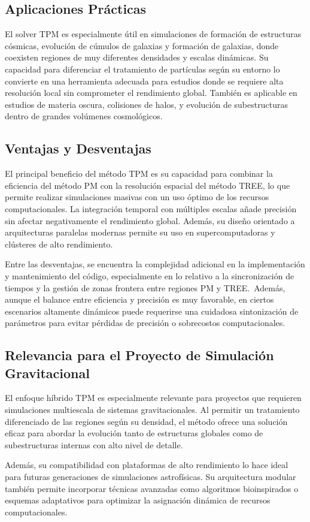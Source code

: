 \subsection{Aplicaciones Prácticas}

El solver TPM es especialmente útil en simulaciones de formación de estructuras cósmicas, evolución de cúmulos de galaxias y formación de galaxias, donde coexisten regiones de muy diferentes densidades y escalas dinámicas. Su capacidad para diferenciar el tratamiento de partículas según su entorno lo convierte en una herramienta adecuada para estudios donde se requiere alta resolución local sin comprometer el rendimiento global. También es aplicable en estudios de materia oscura, colisiones de halos, y evolución de subestructuras dentro de grandes volúmenes cosmológicos.

\subsection{Ventajas y Desventajas}

El principal beneficio del método TPM es su capacidad para combinar la eficiencia del método PM con la resolución espacial del método TREE, lo que permite realizar simulaciones masivas con un uso óptimo de los recursos computacionales. La integración temporal con múltiples escalas añade precisión sin afectar negativamente el rendimiento global. Además, su diseño orientado a arquitecturas paralelas modernas permite su uso en supercomputadoras y clústeres de alto rendimiento.

Entre las desventajas, se encuentra la complejidad adicional en la implementación y mantenimiento del código, especialmente en lo relativo a la sincronización de tiempos y la gestión de zonas frontera entre regiones PM y TREE.\ Además, aunque el balance entre eficiencia y precisión es muy favorable, en ciertos escenarios altamente dinámicos puede requerirse una cuidadosa sintonización de parámetros para evitar pérdidas de precisión o sobrecostos computacionales.

\subsection{Relevancia para el Proyecto de Simulación Gravitacional}

El enfoque híbrido TPM es especialmente relevante para proyectos que requieren simulaciones multiescala de sistemas gravitacionales. Al permitir un tratamiento diferenciado de las regiones según su densidad, el método ofrece una solución eficaz para abordar la evolución tanto de estructuras globales como de subestructuras internas con alto nivel de detalle.

Además, su compatibilidad con plataformas de alto rendimiento lo hace ideal para futuras generaciones de simulaciones astrofísicas. Su arquitectura modular también permite incorporar técnicas avanzadas como algoritmos bioinspirados o esquemas adaptativos para optimizar la asignación dinámica de recursos computacionales.

